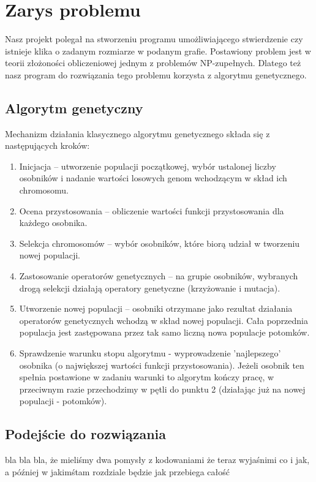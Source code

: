 \documentclass[11pt]{aghdpl}
\author{Wojciech Kasperek, Krzysztof Spytkowski, Izabela Śmietana}
\date{2014}
\begin{document}
\titlepages

\tableofcontents
\clearpage

\chapter{Zarys problemu}
\label{cha:wprowadzenie}
Nasz projekt polegał na stworzeniu programu umożliwiającego stwierdzenie czy istnieje klika o zadanym rozmiarze w podanym grafie. Postawiony problem jest w teorii złożoności obliczeniowej jednym z problemów NP-zupełnych. Dlatego też nasz program do rozwiązania tego problemu korzysta z algorytmu genetycznego. 
\section{Algorytm genetyczny}
\label{sec:algGenetyczne}
Mechanizm działania klasycznego algorytmu genetycznego składa się z następujących kroków:
\begin{enumerate}
\item Inicjacja – utworzenie populacji początkowej, wybór ustalonej liczby osobników i nadanie wartości losowych genom wchodzącym w skład ich chromosomu.
\item Ocena przystosowania – obliczenie wartości funkcji przystosowania dla każdego osobnika.
\item Selekcja chromosomów – wybór osobników, które biorą udział w tworzeniu nowej populacji.
\item Zastosowanie operatorów genetycznych – na grupie osobników, wybranych drogą selekcji działają
operatory genetyczne (krzyżowanie i mutacja).
\item Utworzenie nowej populacji – osobniki otrzymane jako rezultat działania operatorów
genetycznych wchodzą w skład nowej populacji. Cała poprzednia populacja jest zastępowana przez
tak samo liczną nowa populacje potomków.
\item Sprawdzenie warunku stopu algorytmu - wyprowadzenie 'najlepszego' osobnika (o największej wartości funkcji przystosowania). Jeżeli osobnik ten spełnia postawione w zadaniu warunki to algorytm kończy pracę, w przeciwnym razie przechodzimy w pętli do punktu 2 (działając już na nowej populacji - potomków).

\end{enumerate}
\section{Podejście do rozwiązania}
\label{sec:podejscie}
bla bla bla, że mieliśmy dwa pomysły z kodowaniami
że teraz wyjaśnimi co i jak, a później w jakimśtam rozdziale będzie jak przebiega całość
\end{document}
